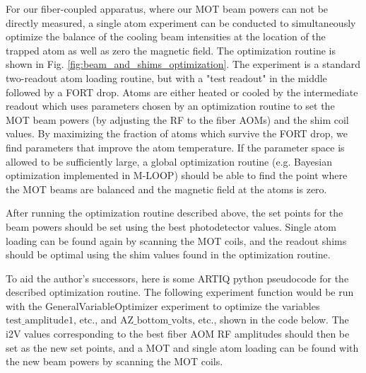 For our fiber-coupled apparatus, where our MOT beam powers can not be directly measured, a single atom experiment can be conducted to simultaneously optimize the balance of the cooling beam intensities at the location of the trapped atom as well as zero the magnetic field. The optimization routine is shown in Fig. \ref{fig:beam_and_shims_optimization}. The experiment is a standard two-readout atom loading routine, but with a "test readout" in the middle followed by a FORT drop. Atoms are either heated or cooled by the intermediate readout which uses parameters chosen by an optimization routine to set the MOT beam powers (by adjusting the RF to the fiber AOMs) and the shim coil values. By maximizing the fraction of atoms which survive the FORT drop, we find parameters that improve the atom temperature. If the parameter space is allowed to be sufficiently large, a global optimization routine (e.g. Bayesian optimization implemented in M-LOOP) should be able to find the point where the MOT beams are balanced and the magnetic field at the atoms is zero.

After running the optimization routine described above, the set points for the beam powers should be set using the best photodetector values. Single atom loading can be found again by scanning the MOT coils, and the readout shims should be optimal using the shim values found in the optimization routine.

To aid the author's successors, here is some ARTIQ python pseudocode for the described optimization routine. The following experiment function would be run with the GeneralVariableOptimizer experiment to optimize the variables $\mathrm{test} \_ \mathrm{amplitude}1$, etc.,  and $\mathrm{AZ} \_ \mathrm{bottom} \_ \mathrm{volts}$, etc., shown in the code below. The i2V values corresponding to the best fiber AOM RF amplitudes should then be set as the new set points, and a MOT and single atom loading can be found with the new beam powers by scanning the MOT coils.




